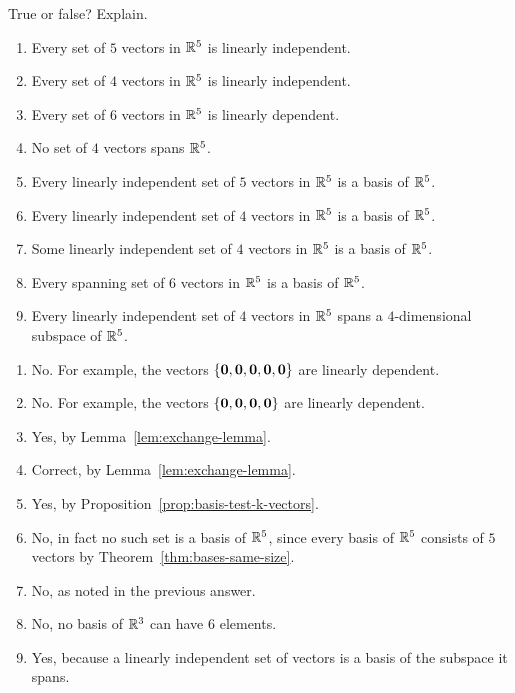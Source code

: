 \begin{ex}
  True or false? Explain.
  \begin{enumerate}
  \item Every set of $5$ vectors in $\mathbb{R}^{5}$ is linearly independent.
  \item Every set of $4$ vectors in $\mathbb{R}^{5}$ is linearly independent.
  \item Every set of $6$ vectors in $\mathbb{R}^{5}$ is linearly dependent.
  \item No set of $4$ vectors spans $\mathbb{R}^{5}$.
  \item Every linearly independent set of $5$ vectors in $\mathbb{R}^5$ is a
    basis of $\mathbb{R}^5$.
  \item Every linearly independent set of $4$ vectors in $\mathbb{R}^5$ is a
    basis of $\mathbb{R}^5$.
  \item Some linearly independent set of $4$ vectors in $\mathbb{R}^5$ is a
    basis of $\mathbb{R}^5$.
  \item Every spanning set of $6$ vectors in $\mathbb{R}^5$ is a basis of
    $\mathbb{R}^5$.
  \item Every linearly independent set of $4$ vectors in $\mathbb{R}^5$ spans
    a $4$-dimensional subspace of $\mathbb{R}^5$.
  \end{enumerate}
  \begin{sol}
    \begin{enumerate}
    \item No. For example, the vectors
      $\left\{\mbox{\bf 0},\mbox{\bf 0},\mbox{\bf 0},\mbox{\bf 0},\mbox{\bf 0}\right\}$ are
      linearly dependent.
    \item No. For example, the vectors
      $\left\{\mbox{\bf 0},\mbox{\bf 0},\mbox{\bf 0},\mbox{\bf 0}\right\}$ are linearly
      dependent.
    \item Yes, by Lemma~\ref{lem:exchange-lemma}.
    \item Correct, by Lemma~\ref{lem:exchange-lemma}.
    \item Yes, by Proposition~\ref{prop:basis-test-k-vectors}.
    \item No, in fact no such set is a basis of $\mathbb{R}^5$, since every
      basis of $\mathbb{R}^5$ consists of $5$ vectors by
      Theorem~\ref{thm:bases-same-size}.
    \item No, as noted in the previous answer.
    \item No, no basis of $\mathbb{R}^3$ can have $6$ elements.
    \item Yes, because a linearly independent set of vectors is a
      basis of the subspace it spans.
    \end{enumerate}
  \end{sol}
\end{ex}

